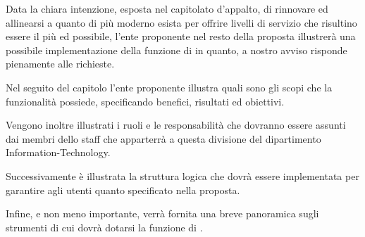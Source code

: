 Data la chiara intenzione, esposta nel capitolato d'appalto, di rinnovare ed allinearsi a quanto di più moderno esista per offrire livelli di servizio che risultino essere il più  ed  possibile, l'ente proponente nel resto della proposta illustrerà una possibile implementazione della funzione di  in quanto, a nostro avviso risponde pienamente alle richieste.

Nel seguito del capitolo l'ente proponente illustra quali sono gli scopi che la funzionalità possiede, specificando benefici, risultati ed obiettivi.

Vengono inoltre illustrati i ruoli e le responsabilità che dovranno essere assunti dai membri dello staff che apparterrà a questa divisione del dipartimento \acs{Information-Technology}.

Successivamente è illustrata la struttura logica che dovrà essere implementata per garantire agli utenti quanto specificato nella proposta.

Infine, e non meno importante, verrà fornita una breve panoramica sugli strumenti di cui dovrà dotarsi la funzione di .